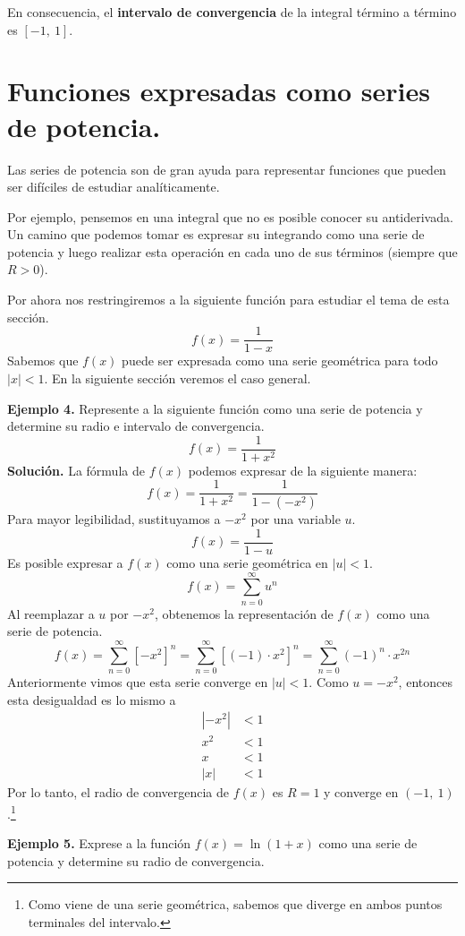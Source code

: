 \documentclass[12pt]{article}
\begin{document}
En consecuencia, el \textbf{intervalo de convergencia} de la integral término a término es $[-1, \ 1]$.


\section{Funciones expresadas como series de potencia.}

Las series de potencia son de gran ayuda para representar funciones que pueden ser difíciles de estudiar analíticamente.

Por ejemplo, pensemos en una integral que no es posible conocer su antiderivada. Un camino que podemos tomar es expresar su integrando como una serie de potencia y luego realizar esta operación en cada uno de sus términos (siempre que $R > 0$).

Por ahora nos restringiremos a la siguiente función para estudiar el tema de esta sección.
\[
  f(x) = \frac{1}{1 - x}
\]
Sabemos que $f(x)$ puede ser expresada como una serie geométrica para todo $|x| < 1$. En la siguiente sección veremos el caso general.

\textbf{Ejemplo 4.} Represente a la siguiente función como una serie de potencia y determine su radio e intervalo de convergencia.
\[
  f(x) = \frac{1}{1 + x^{2}}
\]
\textbf{Solución.} La fórmula de $f(x)$ podemos expresar de la siguiente manera:
\[
  f(x) = \frac{1}{1 + x^{2}} = \frac{1}{1 - (-x^{2})}
\]
Para mayor legibilidad, sustituyamos a $-x^{2}$ por una variable $u$.
\[
  f(x) = \frac{1}{1 - u}
\]
Es posible expresar a $f(x)$ como una serie geométrica en $|u| < 1$.
\[
  f(x) = \sum_{n = 0}^{\infty} u^{n}
\]
Al reemplazar a $u$ por $-x^{2}$, obtenemos la representación de $f(x)$ como una serie de potencia.
\[
  f(x) = \sum_{n = 0}^{\infty} \left[-x^{2}\right]^{n}
       = \sum_{n = 0}^{\infty} \left[(-1) \cdot x^{2}\right]^{n}
       = \sum_{n = 0}^{\infty} (-1)^{n} \cdot x^{2n}
\]
Anteriormente vimos que esta serie converge en $|u| < 1$. Como $u = -x^{2}$, entonces esta desigualdad es lo mismo a
\begin{align*}
  |-x^{2}| &< 1 \\
  x^{2} &< 1 \\
  x &< 1 \\
  |x| &< 1
\end{align*}
Por lo tanto, el radio de convergencia de $f(x)$ es $R = 1$ y converge en $(-1, \ 1)$.\footnote{Como viene de una serie geométrica, sabemos que diverge en ambos puntos terminales del intervalo.}

\textbf{Ejemplo 5.} Exprese a la función $f(x) = \ln(1 + x)$ como una serie de potencia y determine su radio de convergencia.
\end{document}
